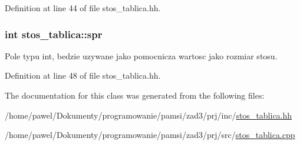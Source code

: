 Definition at line 44 of file stos\-\_\-tablica.\-hh.

\hypertarget{classstos__tablica_a3575eee2f84a127c96e420770605659e}{
\subsubsection[{spr}]{\setlength{\rightskip}{0pt plus 5cm}int stos\-\_\-tablica\-::spr\hspace{0.3cm}{\ttfamily [private]}}}\label{classstos__tablica_a3575eee2f84a127c96e420770605659e}


Pole typu int, bedzie uzywane jako pomocnicza wartosc jako rozmiar stosu. 



Definition at line 48 of file stos\-\_\-tablica.\-hh.



The documentation for this class was generated from the following files\-:\begin{DoxyCompactItemize}
\item 
/home/pawel/\-Dokumenty/programowanie/pamsi/zad3/prj/inc/\hyperlink{stos__tablica_8hh}{stos\-\_\-tablica.\-hh}\item 
/home/pawel/\-Dokumenty/programowanie/pamsi/zad3/prj/src/\hyperlink{stos__tablica_8cpp}{stos\-\_\-tablica.\-cpp}\end{DoxyCompactItemize}

